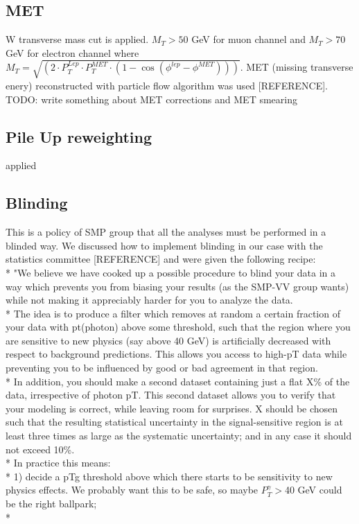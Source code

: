 \subsection{MET}
W transverse mass cut is applied. $M_T>50$ GeV for muon channel and $M_T>70$ GeV for electron channel where $M_T=\sqrt{(2 \cdot P_T^{Lep} \cdot P_T^{MET} \cdot (1-\cos{(\phi^{lep}-\phi^{MET})}))}$. MET (missing transverse enery) reconstructed with particle flow algorithm was used [REFERENCE]. 
TODO: write something about MET corrections and MET smearing

\subsection{Pile Up reweighting}
applied

\subsection{Blinding}
This is a policy of SMP group that all the analyses must be performed in a blinded way. We discussed how to implement blinding in our case with the statistics committee [REFERENCE] and were given the following recipe:\\*
"We believe we have cooked up a possible procedure to blind your data in a way which prevents you from biasing your results (as the SMP-VV group wants) while not making it appreciably harder for you to analyze the data. \\*
The idea is to produce a filter which removes at random a certain fraction of your data with pt(photon) above some threshold, such that the region where you are sensitive to new physics (say above 40 GeV) is artificially decreased with respect to background predictions. This allows you access to high-pT data while preventing you to be influenced by good or bad agreement in that region.\\*
In addition, you should make a second dataset containing just a flat X\% of the data, irrespective of photon pT. This second dataset allows you to verify that your modeling is correct, while leaving room for surprises. X should be chosen such that the resulting statistical uncertainty in the signal-sensitive region is at least three times as large as the systematic uncertainty; and in any case it should not exceed 10\%.\\*
In practice this means: \\*
1) decide a pTg threshold above which there starts to be sensitivity to new physics effects. We probably want this to be safe, so maybe $P_T^{\gamma}>$40 GeV could be the right ballpark;\\*
